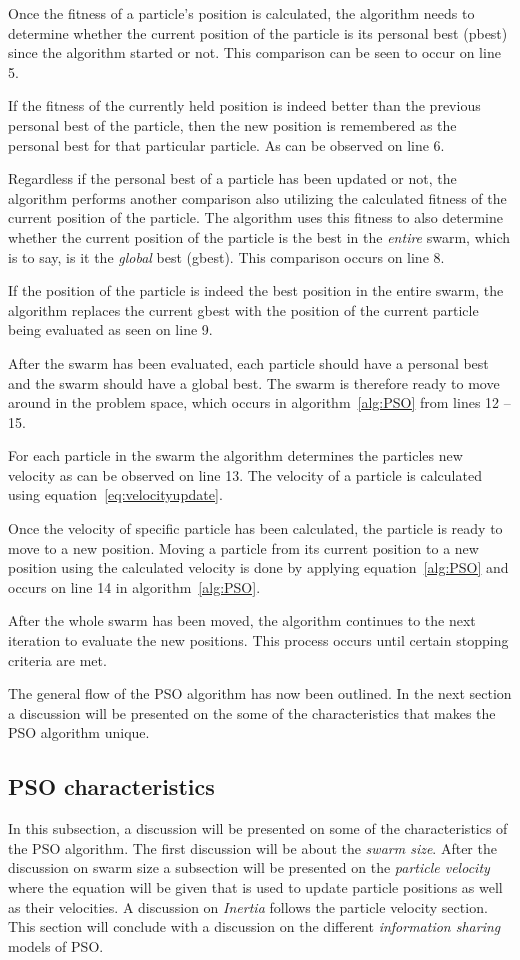 Once the fitness of a particle's position is calculated, the algorithm needs to determine whether the current position of the particle is its personal best (pbest) since the algorithm started or not. This comparison can be seen to occur on line 5. 

If the fitness of the currently held position is indeed better than the previous personal best of the particle, then the new position is remembered as the personal best for that particular particle. As can be observed on line 6.

Regardless if the personal best of a particle has been updated or not, the algorithm performs another comparison also utilizing the calculated fitness of the current position of the particle. The algorithm uses this fitness to also determine whether the current position of the particle is the best in the \emph{entire} swarm, which is to say, is it the \emph{global} best (gbest). This comparison occurs on line  8.

If the position of the particle is indeed the best position in the entire swarm, the algorithm replaces the current gbest with the position of the current particle being evaluated as seen on line 9.

After the swarm has been evaluated, each particle should have a personal best and the swarm should have a global best. The swarm is therefore ready to move around in the problem space, which occurs in algorithm~\ref{alg:PSO} from lines 12 -- 15.

For each particle in the swarm the algorithm determines the particles new velocity as can be observed on line 13. The velocity of a particle is calculated using equation~\ref{eq:velocityupdate}. 

Once the velocity of specific particle has been calculated, the particle is ready to move to a new position. Moving a particle from its current position to a new position using the calculated velocity is done by applying equation~\ref{alg:PSO} and occurs on line 14 in algorithm~\ref{alg:PSO}.

After the whole swarm has been moved, the algorithm continues to the next iteration to evaluate the new positions. This process occurs until certain stopping criteria are met.

The general flow of the PSO algorithm has now been outlined. In the next section a discussion will be presented on the some of the characteristics that makes the PSO algorithm unique.
\subsection{PSO characteristics}
\label{sec:psocharacteristics}
In this subsection, a discussion will be presented on some of the characteristics of the PSO algorithm. The first discussion will be about the \emph{swarm size}. After the discussion on swarm size a subsection will be presented on the \emph{particle velocity} where the equation will be given that is used to update particle positions as well as their velocities. A discussion on \emph{Inertia} follows the particle velocity section. This section will conclude with a discussion on the different \emph{information sharing} models of PSO.
